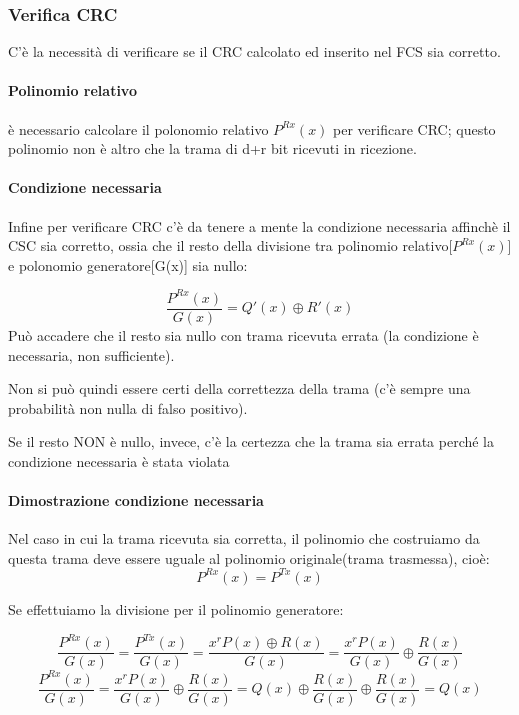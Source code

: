 \subsubsection{Verifica CRC}

C'è la necessità di verificare se il CRC calcolato ed inserito nel FCS sia corretto.
\paragraph{Polinomio relativo} è necessario calcolare il polonomio relativo $P^{Rx}(x)$ per verificare CRC; questo polinomio non è altro che la trama di d+r bit ricevuti in ricezione.
\paragraph{Condizione necessaria}
Infine per verificare CRC c'è da tenere a mente la condizione necessaria affinchè il CSC sia corretto, ossia che il resto della divisione tra polinomio relativo[$P^{Rx}(x)$] e polonomio generatore[G(x)] sia nullo:

\begin{equation}
    \frac{P^{Rx}(x)}{G(x)} = Q'(x) \oplus R'(x)
\end{equation}
Può accadere che il resto sia nullo con trama ricevuta errata (la condizione è necessaria, non sufficiente). 

Non si può quindi essere certi della correttezza della trama (c'è sempre una
probabilità non nulla di falso positivo).

Se il resto NON è nullo, invece, c'è la certezza che la trama sia errata
perché la condizione necessaria è stata violata

\paragraph{Dimostrazione condizione necessaria}
Nel caso in cui la trama ricevuta sia corretta, il polinomio che costruiamo da questa trama deve essere uguale al polinomio originale(trama trasmessa), cioè:
\begin{equation}
    P^{Rx}(x) = P^{Tx}(x)
\end{equation}

Se effettuiamo la divisione per il polinomio generatore:

    \begin{equation}
        \frac{P^{Rx}(x)}{G(x)} = \frac{P^{Tx}(x)}{G(x)} = \frac{x^rP(x) \oplus R(x)}{G(x)} = \frac{x^rP(x)}{G(x)} \oplus \frac{R(x)}{G(x)}
    \end{equation}
    \begin{equation}
        \frac{P^{Rx}(x)}{G(x)} = \frac{x^rP(x)}{G(x)} \oplus \frac{R(x)}{G(x)} = Q(x) \oplus \frac{R(x)}{G(x)} \oplus \frac{R(x)}{G(x)} = Q(x)
    \end{equation}

